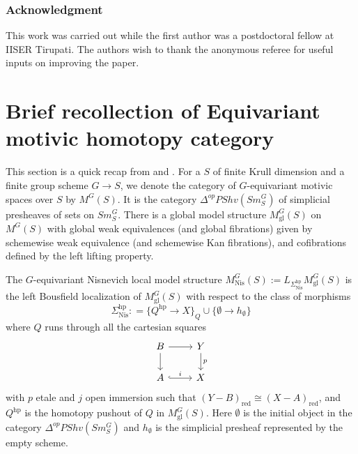\documentclass[11pt,twoside]{amsart}
\theoremstyle{definition}
\theoremstyle{remark}
\numberwithin{equation}{section}
\begin{document}
\subsubsection*{Acknowledgment}
    This work was carried out while the first author was a postdoctoral fellow at IISER Tirupati. The authors wish to thank the anonymous referee for useful inputs on improving the paper.

\section{Brief recollection of Equivariant motivic homotopy category} 

This section is a quick recap from \cite{HKO14} and \cite{HVO}. For a $S$ of finite Krull dimension and a finite group scheme $G\rightarrow S$, we denote the category of $G$-equivariant motivic spaces over $S$ by $M^G(S)$. It is the category  $\Delta^{op}PShv(Sm_S^G)$  of simplicial presheaves of sets on $Sm^G_S$. There is a global model structure $M^G_{\mathrm{gl}}(S)$ on $M^G(S)$ with global weak equivalences (and global fibrations)  given by schemewise weak equivalence (and schemewise Kan fibrations), and cofibrations defined by the left lifting property.

The $G$-equivariant Nisnevich local model structure $M_{\mathrm{Nis}}^G(S) := L_{\Sigma_{\mathrm{Nis}}^{\mathrm{hp}}}M^G_{\mathrm{gl}}(S)$ is the left Bousfield localization of $M^G_{\mathrm{gl}}(S)$ with respect to the class of morphisms 
\begin{equation}\label{eq:nis-cd-square}\Sigma_{\mathrm{Nis}}^{\mathrm{hp}} : = \{ Q^{\mathrm{hp}} \rightarrow X \}_Q \cup \{ \emptyset \rightarrow h_{\emptyset}\}\end{equation}
where $Q$ runs through all the cartesian squares 
\begin{equation}
\label{eq:nis-cd-square II}
\begin{tikzcd}	
B \arrow[r] \arrow[d] & Y \arrow[d, "p"]
\\
A \arrow[r, hook, "i"] & X 			
\end{tikzcd}
\end{equation}
with $p$ etale and $j$ open immersion such that $ (Y-B)_{\mathrm{red}}  \cong (X-A)_{\mathrm{red}} $, and $Q^{\mathrm{hp}}$ is the homotopy pushout of $Q$ in $M_{\mathrm{gl}}^G(S)$. Here $\emptyset$ is the initial object in the category $\Delta^{op}PShv(Sm_S^G)$ and $h_\emptyset$ is the simplicial presheaf represented by the empty scheme.
\end{document}
